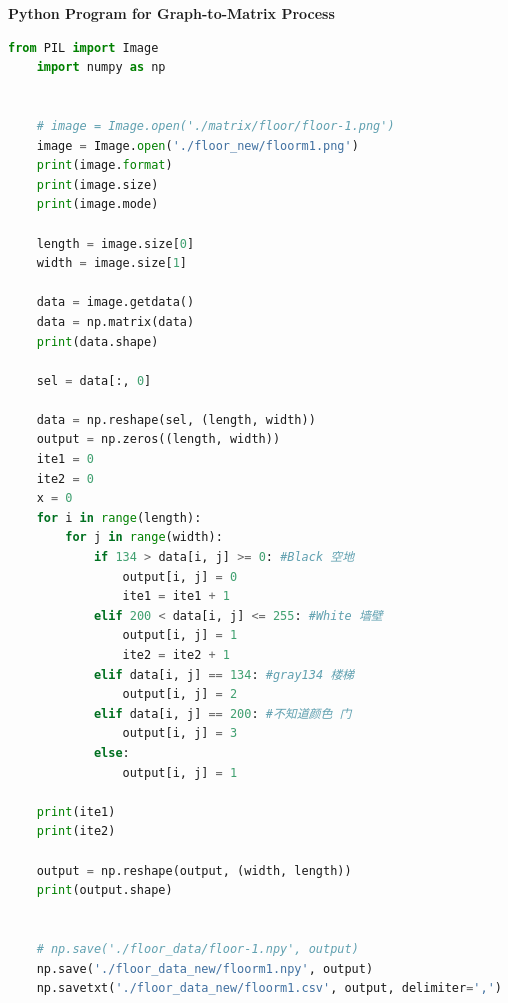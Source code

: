 \documentclass{mcmthesis}
\begin{document}
\noindent\textbf{\Large{Python Program for Graph-to-Matrix Process}}
\lstset{
basicstyle=\sffamily,
keywordstyle=\bfseries,
commentstyle=\rmfamily\itshape,
stringstyle=\ttfamily,
flexiblecolumns,
numbers=left,
numberstyle=\footnotesize}
\begin{lstlisting}[language=Python]
    from PIL import Image
    import numpy as np
    
    
    # image = Image.open('./matrix/floor/floor-1.png') 
    image = Image.open('./floor_new/floorm1.png')
    print(image.format)  
    print(image.size)  
    print(image.mode)  
    
    length = image.size[0]
    width = image.size[1]
    
    data = image.getdata()
    data = np.matrix(data)
    print(data.shape)
    
    sel = data[:, 0]
    
    data = np.reshape(sel, (length, width))
    output = np.zeros((length, width))
    ite1 = 0
    ite2 = 0
    x = 0
    for i in range(length):
        for j in range(width):
            if 134 > data[i, j] >= 0: #Black 空地
                output[i, j] = 0
                ite1 = ite1 + 1
            elif 200 < data[i, j] <= 255: #White 墙壁
                output[i, j] = 1
                ite2 = ite2 + 1
            elif data[i, j] == 134: #gray134 楼梯
                output[i, j] = 2
            elif data[i, j] == 200: #不知道颜色 门
                output[i, j] = 3
            else: 
                output[i, j] = 1
    
    print(ite1)
    print(ite2)
    
    output = np.reshape(output, (width, length))
    print(output.shape)
    
    
    # np.save('./floor_data/floor-1.npy', output)
    np.save('./floor_data_new/floorm1.npy', output)
    np.savetxt('./floor_data_new/floorm1.csv', output, delimiter=',')
    
\end{lstlisting}
\end{document}
